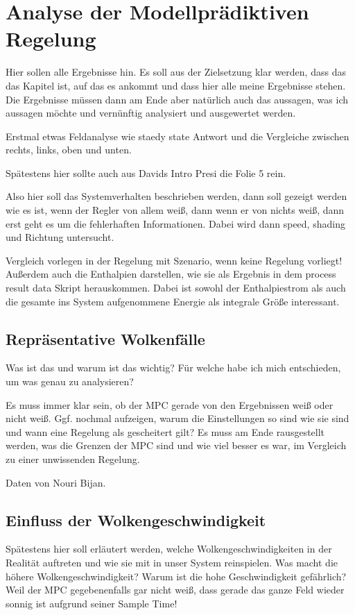\chapter{Analyse der Modellprädiktiven Regelung} \label{ch_AnalyseRegelung}
Hier sollen alle Ergebnisse hin.
Es soll aus der Zielsetzung klar werden, dass das das Kapitel ist, auf das es ankommt und dass hier alle meine Ergebnisse stehen.
Die Ergebnisse müssen dann am Ende aber natürlich auch das aussagen, was ich aussagen möchte und vernünftig analysiert und ausgewertet werden.

Erstmal etwas Feldanalyse wie staedy state Antwort und die Vergleiche zwischen rechts, links, oben und unten.

Spätestens hier sollte auch aus Davids Intro Presi die Folie 5 rein.

Also hier soll das Systemverhalten beschrieben werden, dann soll gezeigt werden wie es ist, wenn der Regler von allem weiß, dann wenn er von nichts weiß, dann erst geht es um die fehlerhaften Informationen.
Dabei wird dann speed, shading und Richtung untersucht.

Vergleich vorlegen in der Regelung mit Szenario, wenn keine Regelung vorliegt!
Außerdem auch die Enthalpien darstellen, wie sie als Ergebnis in dem process result data Skript herauskommen.
Dabei ist sowohl der Enthalpiestrom als auch die gesamte ins System aufgenommene Energie als integrale Größe interessant.

\section{Repräsentative Wolkenfälle} \label{sec_Wolkenfälle}
Was ist das und warum ist das wichtig?
Für welche habe ich mich entschieden, um was genau zu analysieren?

Es muss immer klar sein, ob der MPC gerade von den Ergebnissen weiß oder nicht weiß.
Ggf. nochmal aufzeigen, warum die Einstellungen so sind wie sie sind und wann eine Regelung als gescheitert gilt?
Es muss am Ende rausgestellt werden, was die Grenzen der MPC sind und wie viel besser es war, im Vergleich zu einer unwissenden Regelung.

Daten von Nouri Bijan.



\section{Einfluss der Wolkengeschwindigkeit} \label{sec_EinflussGeschwindigkeit}
Spätestens hier soll erläutert werden, welche Wolkengeschwindigkeiten in der Realität auftreten und wie sie mit in unser System reinspielen.
Was macht die höhere Wolkengeschwindigkeit? Warum ist die hohe Geschwindigkeit gefährlich?
Weil der MPC gegebenenfalls gar nicht weiß, dass gerade das ganze Feld wieder sonnig ist aufgrund seiner Sample Time!

